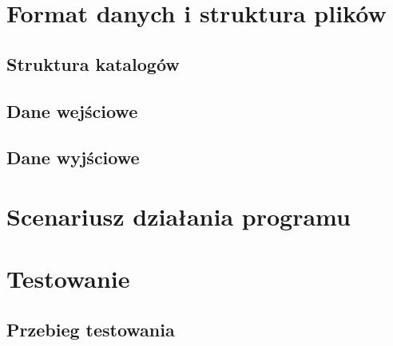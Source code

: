 \documentclass{article}
\begin{document}
    \newpage

    \section{Format danych i struktura plików}
    \subsection{Struktura katalogów}
    \subsection{Dane wejściowe}
    \subsection{Dane wyjściowe}

    \section{Scenariusz działania programu}
    \section{Testowanie}
    \subsection{Przebieg testowania}
\end{document}
